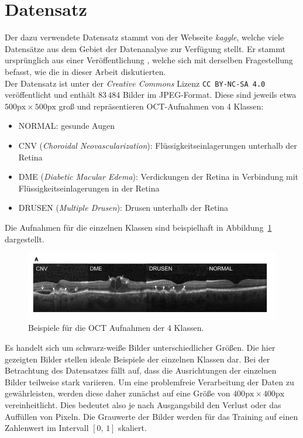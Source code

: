 \section{Datensatz}
%
Der dazu verwendete Datensatz \cite{oct-data} stammt von der Webseite
\textit{kaggle}, welche viele Datensätze aus dem Gebiet der Datenanalyse zur
Verfügung stellt. Er stammt ursprünglich aus einer Veröffentlichung
\cite{paper}, welche sich mit derselben
Fragestellung befasst, wie die in dieser Arbeit diskutierten. \\
Der Datensatz ist unter der \textit{Creative Commons} Lizenz
\texttt{CC BY-NC-SA 4.0} veröffentlicht und enthält $83\,484$ Bilder im
JPEG-Format. Diese sind jeweils etwa $500\text{px}\times500\text{px}$ groß
und repräsentieren OCT-Aufnahmen von 4 Klassen:
%
\begin{itemize}
  \item NORMAL: gesunde Augen
  \item CNV (\textit{Choroidal Neovascularization}): Flüssigkeitseinlagerungen unterhalb der Retina
  \item DME (\textit{Diabetic Macular Edema}): Verdickungen der Retina in Verbindung mit Flüssigkeitseinlagerungen in der Retina
  \item DRUSEN (\textit{Multiple Drusen}): Drusen unterhalb der Retina
\end{itemize}
%
Die Aufnahmen für die einzelnen Klassen sind beispielhaft in
Abbildung~\ref{fig:scans} dargestellt.
%
\begin{figure}
  \centering
  \includegraphics[width=\textwidth]{Plots/title.png}
  \caption{Beispiele für die OCT Aufnahmen der 4 Klassen.}
  \label{fig:scans}
\end{figure}
%
Es handelt sich um schwarz-weiße Bilder unterschiedlicher Größen. Die hier
gezeigten Bilder stellen ideale Beispiele der einzelnen Klassen dar.
Bei der Betrachtung des Datensatzes fällt auf, dass die Ausrichtungen der
einzelnen Bilder teilweise stark variieren. Um eine problemfreie
Verarbeitung der Daten zu gewährleisten, werden diese daher zunächst auf eine
Größe von $400\text{px}\times400\text{px}$ vereinheitlicht. Dies bedeutet also
je nach Ausgangsbild den Verlust oder das Auffüllen von Pixeln. Die Grauwerte
der Bilder werden für das Training auf einen Zahlenwert im Intervall $[0,\,1]$
skaliert.%
